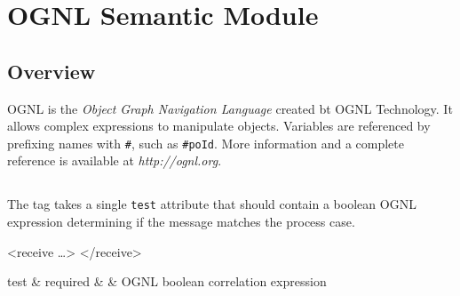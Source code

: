 \chapter{OGNL Semantic Module}

\section{Overview}

OGNL is the \emph{Object Graph Navigation Language}
created bt OGNL Technology.  It allows complex expressions to
manipulate objects.  Variables are referenced by prefixing
names with \verb|#|, such as \verb|#poId|.  More information
and a complete reference is available at \emph{http://ognl.org}.

\section{}

The  tag takes a single \verb|test| attribute
that should contain a boolean OGNL expression determining if
the message matches the process case.

\begin{codelisting}
<receive \dots>
</receive>
\end{codelisting}

\begin{attrDefs}
test		&	required	&			& OGNL boolean correlation expression \\
\end{attrDefs}
